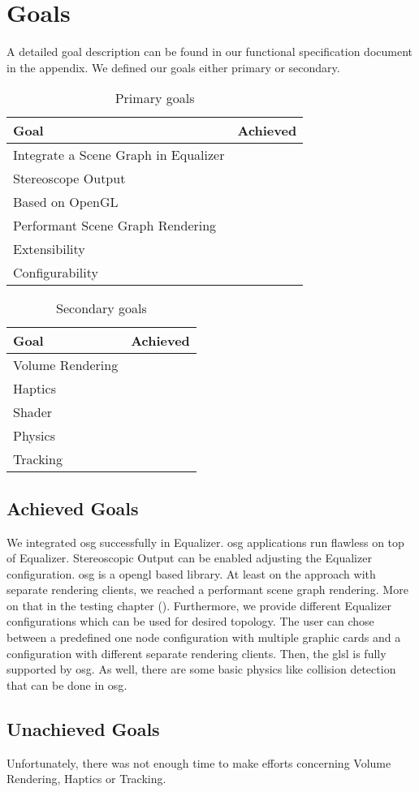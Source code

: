 
\chapter{Goals}
A detailed goal description can be found in our functional specification document in the appendix. We defined our goals either primary or secondary.

\begin{table}[H]
	\centering
	\begin{tabular}{|p{}|p{}|}
		\hline  \bfseries Goal & \bfseries Achieved \\ 
		\hline
		\hline Integrate a Scene Graph in Equalizer	& \tick \\
		\hline Stereoscope Output 					& \tick \\
		\hline Based on OpenGL 						& \tick \\
		\hline Performant Scene Graph Rendering 	& \tick \\
		\hline Extensibility 						& \tick \\
		\hline Configurability						& \tick \\
		\hline
	\end{tabular}
	\caption{Primary goals}
\end{table}

\begin{table}[H]
	\centering
	\begin{tabular}{|p{}|p{}|}
		\hline \bfseries Goal & \bfseries Achieved \\ 
		\hline
		\hline Volume Rendering					& \cross \\
		\hline Haptics 							& \cross \\
		\hline Shader 							& \tick \\
		\hline Physics 							& \partialTick \\
		\hline Tracking							& \cross \\
		\hline
	\end{tabular}
	\caption{Secondary goals}
\end{table}

\section{Achieved Goals}
We integrated \gls{osg} successfully in Equalizer. \gls{osg} applications run flawless on top of Equalizer. Stereoscopic Output can be enabled adjusting the Equalizer configuration. \gls{osg} is a \gls{opengl} based library. At least on the approach with separate rendering clients, we reached a performant scene graph rendering. More on that in the testing chapter (). Furthermore, we provide different Equalizer configurations which can be used for desired topology. The user can chose between a predefined one node configuration with multiple graphic cards and a configuration with different separate rendering clients. Then, the \gls{glsl} is fully supported by \gls{osg}. As well, there are some basic physics like collision detection that can be done in \gls{osg}.

\section{Unachieved Goals}
Unfortunately, there was not enough time to make efforts concerning Volume Rendering, Haptics or Tracking.
